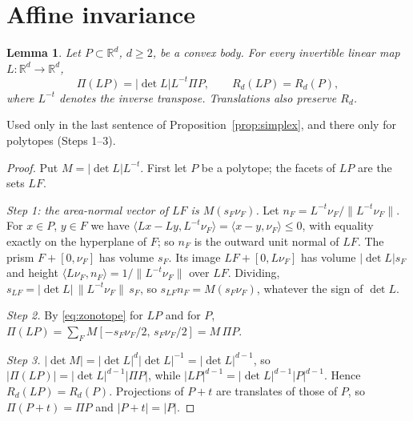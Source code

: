 \documentclass[11pt]{article}
\newtheorem{lemma}[theorem]{Lemma}
\newcommand{\R}{\mathbb R}
\begin{document}
\section{Affine invariance}

\begin{lemma}\label{lem:affine}
Let \(P\subset\R^d\), \(d\ge2\), be a convex body. For every
invertible linear map \(L\colon\R^d\to\R^d\),
\[
 \Pi(LP)=|\det L|L^{-t}\Pi P,\qquad R_d(LP)=R_d(P),
\]
where \(L^{-t}\) denotes the inverse transpose. Translations also
preserve \(R_d\).
\end{lemma}

Used only in the last sentence of Proposition~\ref{prop:simplex}, and there only for polytopes (Steps 1--3).

\begin{proof}
Put \(M=|\det L|L^{-t}\). First let \(P\) be a polytope; the facets of \(LP\) are the sets \(LF\).

\emph{Step 1: the area-normal vector of \(LF\) is \(M(s_F\nu_F)\).} Let \(n_F=L^{-t}\nu_F/\|L^{-t}\nu_F\|\). For \(x\in P\), \(y\in F\) we have \(\langle Lx-Ly,L^{-t}\nu_F\rangle=\langle x-y,\nu_F\rangle\le0\), with equality exactly on the hyperplane of \(F\); so \(n_F\) is the outward unit normal of \(LF\). The prism \(F+[0,\nu_F]\) has volume \(s_F\). Its image \(LF+[0,L\nu_F]\) has volume \(|\det L|s_F\) and height \(\langle L\nu_F,n_F\rangle=1/\|L^{-t}\nu_F\|\) over \(LF\). Dividing, \(s_{LF}=|\det L|\,\|L^{-t}\nu_F\|\,s_F\), so \(s_{LF}n_F=M(s_F\nu_F)\), whatever the sign of \(\det L\).

\emph{Step 2.} By \eqref{eq:zonotope} for \(LP\) and for \(P\), \(\Pi(LP)=\sum_F M[-s_F\nu_F/2,\,s_F\nu_F/2]=M\,\Pi P\).

\emph{Step 3.} \(|\det M|=|\det L|^{d}|\det L|^{-1}=|\det L|^{d-1}\), so \(|\Pi(LP)|=|\det L|^{d-1}|\Pi P|\), while \(|LP|^{d-1}=|\det L|^{d-1}|P|^{d-1}\). Hence \(R_d(LP)=R_d(P)\). Projections of \(P+t\) are translates of those of \(P\), so \(\Pi(P+t)=\Pi P\) and \(|P+t|=|P|\).


\end{proof}
\end{document}
